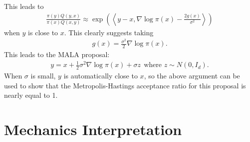\documentclass{scrartcl}
\begin{document}
This leads to
\begin{align*}
  \frac{\pi(y)Q(y, x)}{\pi(x) Q(x, y)} \approx \exp \left(\left<y - x, \nabla \log \pi(x) -
    \frac{2g(x)}{\sigma^2} \right> \right) 
\end{align*}
when $y$ is close to $x$. This clearly suggests taking 
\begin{align*}
  g(x) = \frac{\sigma^2}{2} \nabla \log \pi(x). 
\end{align*}
This leads to the MALA proposal:
\begin{align}\label{lang_prop}
  y = x + \frac{1}{2} \sigma^2 \nabla \log \pi(x) + \sigma z ~~ \text{
  where $z \sim N(0, I_d)$}. 
\end{align}
When $\sigma$ is small, $y$ is automatically close to $x$, so the
above argument can be used to show that the Metropolis-Hastings
acceptance ratio for this proposal is nearly equal to 1. 

\section{Mechanics Interpretation}
\end{document}

